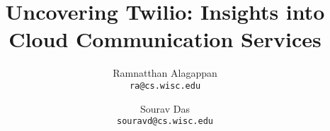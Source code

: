 \title{
     Uncovering Twilio: Insights into Cloud Communication Services
    }

\linespread{1.2}

\author{
  Ramnatthan Alagappan\\
  \texttt{ra@cs.wisc.edu}
  \and
  Sourav Das\\
  \texttt{souravd@cs.wisc.edu}
}

\date{\vspace{-0.2in}}
\maketitle




